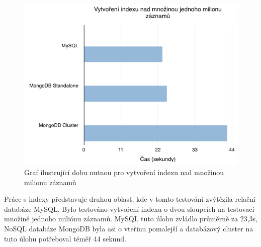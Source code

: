 \begin{figure}[h]
\begin{centering}
\includegraphics[scale=0.6]{obrazky/grafy/addindex}
\par\end{centering}
\caption{Graf ilustrující dobu nutnou pro vytvoření indexu nad množinou milionu záznamů}
\end{figure}
Práce s indexy představuje druhou oblast, kde v tomto testování zvýtězila relační databáze MySQL. Bylo testováno vytvoření indexu o dvou sloupcích na testovací množině jednoho miliónu záznamů. MySQL tuto úlohu zvládlo průměrně za 23,3s, NoSQL databáze MongoDB byla asi o vteřinu pomalejší a databázový cluster na tuto úlohu potřeboval téměř 44 sekund.

